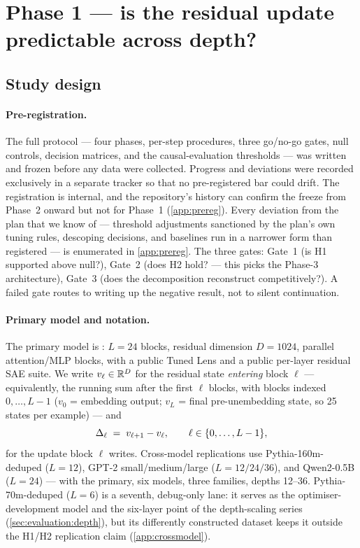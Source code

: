 \section{Phase 1 --- is the residual update predictable across depth?}
\label{sec:phase1}

\subsection{Study design}
\label{sec:phase1:setup}

\paragraph{Pre-registration.}
The full protocol --- four phases, per-step procedures, three go/no-go gates,
null controls, decision matrices, and the causal-evaluation thresholds --- was
written and frozen before any data were collected. Progress and deviations
were recorded exclusively in a separate tracker so that no pre-registered bar
could drift. The registration is internal, and the repository's history can
confirm the freeze from Phase~2 onward but not for Phase~1
(\cref{app:prereg}). Every deviation from the plan that we know of --- threshold
adjustments sanctioned by the plan's own tuning rules, descoping decisions,
and baselines run in a narrower form than registered --- is enumerated in
\cref{app:prereg}. The three gates:
Gate~1 (is H1 supported above null?), Gate~2 (does H2 hold? --- this picks the
Phase-3 architecture), Gate~3 (does the decomposition reconstruct competitively?).
A failed gate routes to writing up the negative result, not to silent
continuation.

\paragraph{Primary model and notation.}
The primary model is \pythia{} \citep{biderman2023pythia}: $L=24$ blocks,
residual dimension $D=1024$, parallel attention/MLP blocks, with a public
Tuned Lens and a public per-layer residual SAE suite. We write $v_\ell \in
\mathbb{R}^{D}$ for the residual state \emph{entering} block $\ell$ ---
equivalently, the running sum after the first $\ell$ blocks, with blocks
indexed $0,\dots,L-1$ ($v_0$ = embedding
output; $v_L$ = final pre-unembedding state, so 25 states per example) --- and
\[
  \Delta_\ell \;=\; v_{\ell+1} - v_\ell, \qquad \ell \in \{0,\dots,L-1\},
\]
for the update block $\ell$ writes. Cross-model replications use
Pythia-160m-deduped ($L{=}12$), GPT-2 small/medium/large
\citep{radford2019language} ($L{=}12/24/36$), and Qwen2-0.5B
\citep{yang2024qwen2} ($L{=}24$) --- with the primary, six models, three
families, depths 12--36. Pythia-70m-deduped ($L{=}6$) is a seventh,
debug-only lane:
it serves as the optimiser-development model and the six-layer point of the
depth-scaling series (\cref{sec:evaluation:depth}), but its differently
constructed dataset keeps it outside the H1/H2 replication claim
(\cref{app:crossmodel}).

